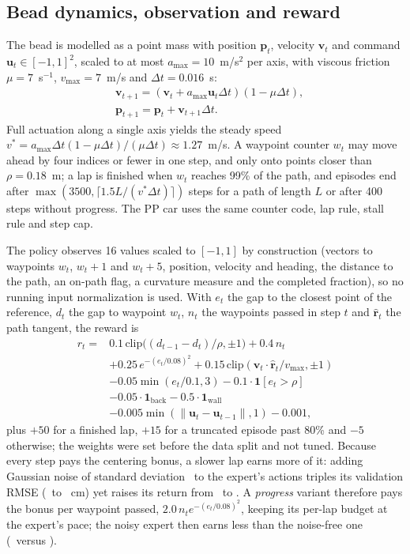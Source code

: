 \documentclass{IJCAS}
\begin{document}
\subsection{Bead dynamics, observation and reward}\label{sec:dyn}
The bead is modelled as a point mass with position $\mathbf{p}_t$, velocity $\mathbf{v}_t$ and command $\mathbf{u}_t\in[-1,1]^2$, scaled to at most $a_{\max}=10$~m/s$^2$ per axis, with viscous friction $\mu=7$~s$^{-1}$, $v_{\max}=7$~m/s and $\Delta t=0.016$~s:
\begin{equation}
\begin{aligned}
&\mathbf{v}_{t+1}=(\mathbf{v}_t+a_{\max}\mathbf{u}_t\Delta t)(1-\mu\Delta t),\\
&\mathbf{p}_{t+1}=\mathbf{p}_t+\mathbf{v}_{t+1}\Delta t.
\end{aligned}\label{eq:dyn}
\end{equation}
Full actuation along a single axis yields the steady speed $v^{*}=a_{\max}\Delta t(1-\mu\Delta t)/(\mu\Delta t)\approx1.27$~m/s. A waypoint counter $w_t$ may move ahead by four indices or fewer in one step, and only onto points closer than $\rho=0.18$~m; a lap is finished when $w_t$ reaches 99\% of the path, and episodes end after $\max(3500,\lceil1.5L/(v^{*}\Delta t)\rceil)$ steps for a path of length $L$ or after 400 steps without progress. The PP car uses the same counter code, lap rule, stall rule and step cap.

The policy observes 16 values scaled to $[-1,1]$ by construction (vectors to waypoints $w_t$, $w_t+1$ and $w_t+5$, position, velocity and heading, the distance to the path, an on-path flag, a curvature measure and the completed fraction), so no running input normalization is used. With $e_t$ the gap to the closest point of the reference, $d_t$ the gap to waypoint $w_t$, $n_t$ the waypoints passed in step $t$ and $\hat{\mathbf{r}}_t$ the path tangent, the reward is
\begin{align}
r_t={}&0.1\,\mathrm{clip}\big((d_{t-1}-d_t)/\rho,\pm1\big)+0.4\,n_t\nonumber\\
&+0.25\,e^{-(e_t/0.08)^2}+0.15\,\mathrm{clip}(\mathbf{v}_t\!\cdot\hat{\mathbf{r}}_t/v_{\max},\pm1)\nonumber\\
&-0.05\min(e_t/0.1,3)-0.1\cdot\mathbf{1}[e_t>\rho]\nonumber\\
&-0.05\cdot\mathbf{1}_{\mathrm{back}}-0.5\cdot\mathbf{1}_{\mathrm{wall}}\nonumber\\
&-0.005\min(\|\mathbf{u}_t-\mathbf{u}_{t-1}\|,1)-0.001,\label{eq:reward}
\end{align}
plus $+50$ for a finished lap, $+15$ for a truncated episode past 80\% and $-5$ otherwise; the weights were set before the data split and not tuned. Because every step pays the centering bonus, a slower lap earns more of it: adding Gaussian noise of standard deviation \VexStd\ to the expert's actions triples its validation RMSE (\VexRmseZero\ to \VexRmseNoise~cm) yet raises its return from \VexRewBzero\ to \VexRewBnoise. A \emph{progress} variant therefore pays the bonus per waypoint passed, $2.0\,n_t e^{-(e_t/0.08)^2}$, keeping its per-lap budget at the expert's pace; the noisy expert then earns less than the noise-free one (\VexRewPnoise\ versus \VexRewPzero).
\end{document}
